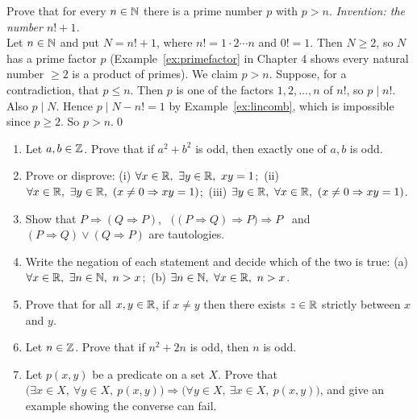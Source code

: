 \begin{bexample}
Prove that for every $n\in\mathbb{N}$ there is a prime number $p$ with $p>n$.
\solution
\emph{Invention: the number $n!+1$.}\\
Let $n\in\mathbb{N}$ and put $N=n!+1$, where $n!=1\cdot2\cdots n$ and $0!=1$. Then $N\ge2$, so $N$ has a prime factor $p$ (Example~\ref{ex:primefactor} in Chapter 4 shows every natural number $\ge2$ is a product of primes). We claim $p>n$. Suppose, for a contradiction, that $p\le n$. Then $p$ is one of the factors $1,2,\dots,n$ of $n!$, so $p\mid n!$. Also $p\mid N$. Hence $p\mid N-n!=1$ by Example~\ref{ex:lincomb}, which is impossible since $p\ge2$. So $p>n$.\qed
\end{bexample}

\begin{stretchbox}[1]
\begin{enumerate}[label=\textbf{S1.\arabic*}, leftmargin=3em]
\item Let $a,b\in\mathbb{Z}$. Prove that if $a^2+b^2$ is odd, then exactly one of $a,b$ is odd. 
\item Prove or disprove: (i) $\forall x\in\mathbb{R},\ \exists y\in\mathbb{R},\ xy=1$;\ (ii) $\forall x\in\mathbb{R},\ \exists y\in\mathbb{R},\ (x\ne0\Rightarrow xy=1)$;\ (iii) $\exists y\in\mathbb{R},\ \forall x\in\mathbb{R},\ (x\ne0\Rightarrow xy=1)$.
\item Show that $P\Rightarrow(Q\Rightarrow P)$, \ $\big((P\Rightarrow Q)\Rightarrow P\big)\Rightarrow P$ \ and \ $(P\Rightarrow Q)\vee(Q\Rightarrow P)$ are tautologies. 
\item Write the negation of each statement and decide which of the two is true: (a) $\forall x\in\mathbb{R},\ \exists n\in\mathbb{N},\ n>x$;\ (b) $\exists n\in\N,\ \forall x\in\R,\ n>x$.
\item Prove that for all $x,y\in\mathbb{R}$, if $x\ne y$ then there exists $z\in\mathbb{R}$ strictly between $x$ and $y$. 
\item Let $n\in\mathbb{Z}$. Prove that if $n^2+2n$ is odd, then $n$ is odd.
\item Let $p(x,y)$ be a predicate on a set $X$. Prove that $\big(\exists x\in X,\ \forall y\in X,\ p(x,y)\big)\Rightarrow\big(\forall y\in X,\ \exists x\in X,\ p(x,y)\big)$, and give an example showing the converse can fail.
\end{enumerate}
\end{stretchbox}
